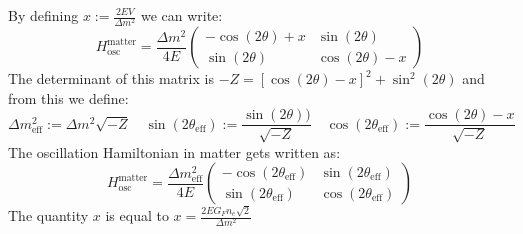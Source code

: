 \documentclass[10.75pt,a4paper,openright,bottom=2cm]{article}
\begin{document}
By defining $x:=\frac{2EV}{\Delta m^2}$ we can write:
\[
H_{\text{osc}}^{\text{matter}}=\frac{\Delta m^2}{4E}\left(\begin{array}{cc}
    -\cos(2\theta)+x & \sin(2\theta) \\
    \sin(2\theta) & \cos(2\theta)-x
\end{array}\right)
\]
The determinant of this matrix is $-Z=[\cos(2\theta)-x]^2+\sin^2(2\theta)$ and from this we define:
\[
\Delta m^2_{\text{eff}}:=\Delta m^2\sqrt{-Z} \quad \sin(2\theta_{\text{eff}}):=\frac{\sin(2\theta))}{\sqrt{-Z}} \quad \cos(2\theta_{\text{eff}}):=\frac{\cos(2\theta)-x}{\sqrt{-Z}}
\]
The oscillation Hamiltonian in matter gets written as:
\[
H_{\text{osc}}^{\text{matter}}=\frac{\Delta m^2_{\text{eff}}}{4E}\left(\begin{array}{cc}
    -\cos(2\theta_{\text{eff}}) & \sin(2\theta_{\text{eff}}) \\
    \sin(2\theta_{\text{eff}}) & \cos(2\theta_{\text{eff}})
\end{array}\right)
\]
The quantity $x$ is equal to $x=\frac{2EG_Fn_e\sqrt{2}}{\Delta m^2}$
\end{document}
